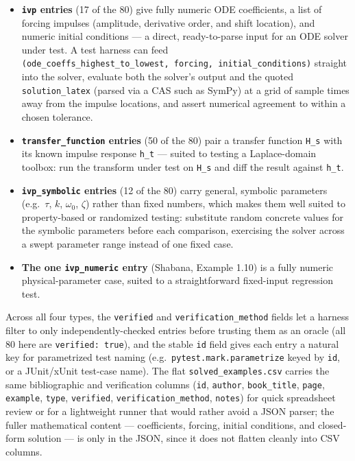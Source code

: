 \documentclass[
  11pt,
]{article}
\providecommand{\tightlist}{%
  \setlength{\itemsep}{0pt}\setlength{\parskip}{0pt}}
\begin{document}
\begin{itemize}
\tightlist
\item
  \textbf{\texttt{ivp} entries} (17 of the 80) give fully numeric ODE
  coefficients, a list of forcing impulses (amplitude, derivative order,
  and shift location), and numeric initial conditions --- a direct,
  ready-to-parse input for an ODE solver under test. A test harness can
  feed
  \texttt{(ode\_coeffs\_highest\_to\_lowest,\ forcing,\ initial\_conditions)}
  straight into the solver, evaluate both the solver's output and the
  quoted \texttt{solution\_latex} (parsed via a CAS such as SymPy) at a
  grid of sample times away from the impulse locations, and assert
  numerical agreement to within a chosen tolerance.
\item
  \textbf{\texttt{transfer\_function} entries} (50 of the 80) pair a
  transfer function \texttt{H\_s} with its known impulse response
  \texttt{h\_t} --- suited to testing a Laplace-domain toolbox: run the
  transform under test on \texttt{H\_s} and diff the result against
  \texttt{h\_t}.
\item
  \textbf{\texttt{ivp\_symbolic} entries} (12 of the 80) carry general,
  symbolic parameters (e.g.~\(\tau\), \(k\), \(\omega_0\), \(\zeta\))
  rather than fixed numbers, which makes them well suited to
  property-based or randomized testing: substitute random concrete
  values for the symbolic parameters before each comparison, exercising
  the solver across a swept parameter range instead of one fixed case.
\item
  \textbf{The one \texttt{ivp\_numeric} entry} (Shabana, Example 1.10)
  is a fully numeric physical-parameter case, suited to a
  straightforward fixed-input regression test.
\end{itemize}

Across all four types, the \texttt{verified} and
\texttt{verification\_method} fields let a harness filter to only
independently-checked entries before trusting them as an oracle (all 80
here are \texttt{verified:\ true}), and the stable \texttt{id} field
gives each entry a natural key for parametrized test naming
(e.g.~\texttt{pytest.mark.parametrize} keyed by \texttt{id}, or a
JUnit/xUnit test-case name). The flat \texttt{solved\_examples.csv}
carries the same bibliographic and verification columns (\texttt{id},
\texttt{author}, \texttt{book\_title}, \texttt{page}, \texttt{example},
\texttt{type}, \texttt{verified}, \texttt{verification\_method},
\texttt{notes}) for quick spreadsheet review or for a lightweight runner
that would rather avoid a JSON parser; the fuller mathematical content
--- coefficients, forcing, initial conditions, and closed-form solution
--- is only in the JSON, since it does not flatten cleanly into CSV
columns.
\end{document}
